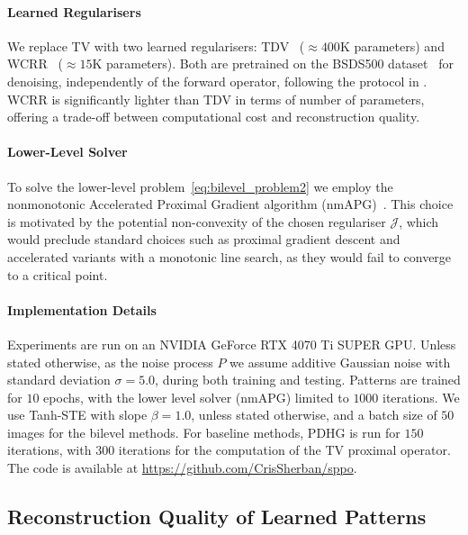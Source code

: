 \documentclass[lettersize,journal]{IEEEtran}
\begin{document}
\paragraph{Learned Regularisers} We replace TV with two learned regularisers: TDV~\cite{Kobler_2020_TotalDeepVariation} ($\approx 400$K parameters) and WCRR~\cite{Goujon_2023_LearningWeaklyConvex} ($\approx 15$K parameters).
Both are pretrained on the BSDS500 dataset~\cite{Martin_2001_DatabaseHumanSegmented} for denoising, independently of the forward operator, following the protocol in \cite {Hertrich_2025_LearningRegularizationFunctionals}. 
WCRR is significantly lighter than TDV in terms of number of parameters, offering a trade-off between computational cost and reconstruction quality.

\paragraph{Lower-Level Solver}
To solve the lower-level problem~\eqref{eq:bilevel_problem2} we employ the nonmonotonic Accelerated Proximal Gradient algorithm (nmAPG)~\cite{Li_2015_AcceleratedProximalGradient}. 
This choice is motivated by the potential non-convexity of the chosen regulariser $\mathcal{J}$, which would preclude standard choices such as proximal gradient descent and accelerated variants with a monotonic line search, as they would fail to converge to a critical point. 

\paragraph{Implementation Details}
Experiments are run on an NVIDIA GeForce RTX 4070 Ti SUPER GPU. 
Unless stated otherwise, as the noise process $P$ we assume additive Gaussian noise with standard deviation $\sigma=5.0$, during both training and testing. 
Patterns are trained for $10$ epochs, with the lower level solver (nmAPG) limited to $1000$ iterations. 
We use Tanh-STE with slope $\beta = 1.0$, unless stated otherwise, and a batch size of $50$ images for the bilevel methods.
For baseline methods, PDHG is run for $150$ iterations, with $300$ iterations for the computation of the TV proximal operator.
The code is available at \href{https://github.com/CrisSherban/sppo}{https://github.com/CrisSherban/sppo}.


\subsection{Reconstruction Quality of Learned Patterns}
\end{document}
